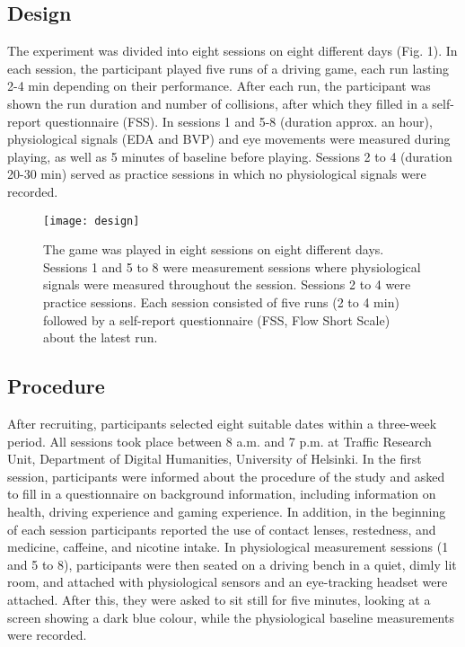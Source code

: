 \documentclass[fleqn,10pt]{wlscirep}
\newcommand{\nicewidth}{0.8\textwidth}
\begin{document}
\subsection*{Design}
The experiment was divided into eight sessions on eight different days (Fig. 1). In each session, the participant played five runs of a driving game, each run lasting 2-4 min depending on their performance. After each run, the participant was shown the run duration and number of collisions, after which they filled in a self-report questionnaire (FSS). In sessions 1 and 5-8 (duration approx. an hour), physiological signals (EDA and BVP) and eye movements were measured during playing, as well as 5 minutes of baseline before playing. Sessions 2 to 4 (duration 20-30 min) served as practice sessions in which no physiological signals were recorded.

\begin{figure}[!ht]
\centering
\texttt{[image: design]}
\caption{The game was played in eight sessions on eight different days. Sessions 1 and 5 to 8 were measurement sessions where physiological signals were measured throughout the session. Sessions 2 to 4 were practice sessions. Each session consisted of five runs (2 to 4 min) followed by a self-report questionnaire (FSS, Flow Short Scale) about the latest run.}
\label{fig:design}
\end{figure}

\subsection*{Procedure}
After recruiting, participants selected eight suitable dates within a three-week period. All sessions took place between 8 a.m. and 7 p.m. at Traffic Research Unit, Department of Digital Humanities, University of Helsinki. In the first session, participants were informed about the procedure of the study and asked to fill in a questionnaire on background information, including information on health, driving experience and gaming experience. In addition, in the beginning of each session participants reported the use of contact lenses, restedness, and medicine, caffeine, and nicotine intake. In physiological measurement sessions (1 and 5 to 8), participants were then seated on a driving bench in a quiet, dimly lit room, and attached with physiological sensors and an eye-tracking headset were attached. After this, they were asked to sit still for five minutes, looking at a screen showing a dark blue colour, while the physiological baseline measurements were recorded.
\end{document}
